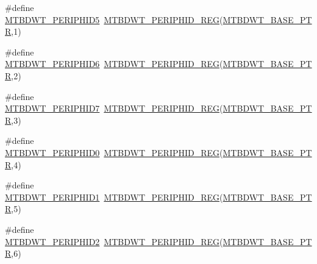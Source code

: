 \begin{DoxyCompactItemize}
\item 
\#define \hyperlink{group___m_t_b_d_w_t___register___accessor___macros_ga784ae33118477a2b68ce261e0caf4b85}{M\+T\+B\+D\+W\+T\+\_\+\+P\+E\+R\+I\+P\+H\+I\+D5}~\hyperlink{group___m_t_b_d_w_t___register___accessor___macros_ga18a6f971f5ddf5bd0f3c5fd2d2b3b2da}{M\+T\+B\+D\+W\+T\+\_\+\+P\+E\+R\+I\+P\+H\+I\+D\+\_\+\+R\+EG}(\hyperlink{group___m_t_b_d_w_t___peripheral_ga97d048bfb5a11293a38c444b8347ff42}{M\+T\+B\+D\+W\+T\+\_\+\+B\+A\+S\+E\+\_\+\+P\+TR},1)
\item 
\#define \hyperlink{group___m_t_b_d_w_t___register___accessor___macros_gac164f79edd8679be62049881e3e01e68}{M\+T\+B\+D\+W\+T\+\_\+\+P\+E\+R\+I\+P\+H\+I\+D6}~\hyperlink{group___m_t_b_d_w_t___register___accessor___macros_ga18a6f971f5ddf5bd0f3c5fd2d2b3b2da}{M\+T\+B\+D\+W\+T\+\_\+\+P\+E\+R\+I\+P\+H\+I\+D\+\_\+\+R\+EG}(\hyperlink{group___m_t_b_d_w_t___peripheral_ga97d048bfb5a11293a38c444b8347ff42}{M\+T\+B\+D\+W\+T\+\_\+\+B\+A\+S\+E\+\_\+\+P\+TR},2)
\item 
\#define \hyperlink{group___m_t_b_d_w_t___register___accessor___macros_ga6f2e5a20f256ee541d4adc833f8d00ed}{M\+T\+B\+D\+W\+T\+\_\+\+P\+E\+R\+I\+P\+H\+I\+D7}~\hyperlink{group___m_t_b_d_w_t___register___accessor___macros_ga18a6f971f5ddf5bd0f3c5fd2d2b3b2da}{M\+T\+B\+D\+W\+T\+\_\+\+P\+E\+R\+I\+P\+H\+I\+D\+\_\+\+R\+EG}(\hyperlink{group___m_t_b_d_w_t___peripheral_ga97d048bfb5a11293a38c444b8347ff42}{M\+T\+B\+D\+W\+T\+\_\+\+B\+A\+S\+E\+\_\+\+P\+TR},3)
\item 
\#define \hyperlink{group___m_t_b_d_w_t___register___accessor___macros_ga07083686c100d0c9d3690d13bf1e6283}{M\+T\+B\+D\+W\+T\+\_\+\+P\+E\+R\+I\+P\+H\+I\+D0}~\hyperlink{group___m_t_b_d_w_t___register___accessor___macros_ga18a6f971f5ddf5bd0f3c5fd2d2b3b2da}{M\+T\+B\+D\+W\+T\+\_\+\+P\+E\+R\+I\+P\+H\+I\+D\+\_\+\+R\+EG}(\hyperlink{group___m_t_b_d_w_t___peripheral_ga97d048bfb5a11293a38c444b8347ff42}{M\+T\+B\+D\+W\+T\+\_\+\+B\+A\+S\+E\+\_\+\+P\+TR},4)
\item 
\#define \hyperlink{group___m_t_b_d_w_t___register___accessor___macros_ga9e516a8106ad8dbb2c338a2727a6b309}{M\+T\+B\+D\+W\+T\+\_\+\+P\+E\+R\+I\+P\+H\+I\+D1}~\hyperlink{group___m_t_b_d_w_t___register___accessor___macros_ga18a6f971f5ddf5bd0f3c5fd2d2b3b2da}{M\+T\+B\+D\+W\+T\+\_\+\+P\+E\+R\+I\+P\+H\+I\+D\+\_\+\+R\+EG}(\hyperlink{group___m_t_b_d_w_t___peripheral_ga97d048bfb5a11293a38c444b8347ff42}{M\+T\+B\+D\+W\+T\+\_\+\+B\+A\+S\+E\+\_\+\+P\+TR},5)
\item 
\#define \hyperlink{group___m_t_b_d_w_t___register___accessor___macros_ga823bbdb0a6008b9e4be7ff1646a8ec41}{M\+T\+B\+D\+W\+T\+\_\+\+P\+E\+R\+I\+P\+H\+I\+D2}~\hyperlink{group___m_t_b_d_w_t___register___accessor___macros_ga18a6f971f5ddf5bd0f3c5fd2d2b3b2da}{M\+T\+B\+D\+W\+T\+\_\+\+P\+E\+R\+I\+P\+H\+I\+D\+\_\+\+R\+EG}(\hyperlink{group___m_t_b_d_w_t___peripheral_ga97d048bfb5a11293a38c444b8347ff42}{M\+T\+B\+D\+W\+T\+\_\+\+B\+A\+S\+E\+\_\+\+P\+TR},6)

\end{DoxyCompactItemize}
